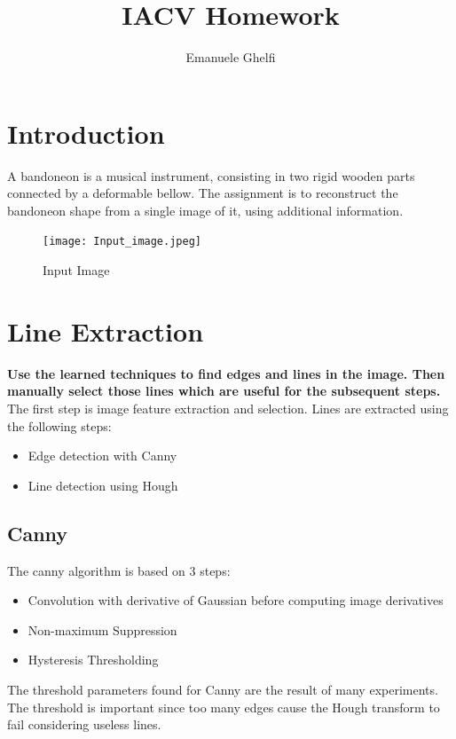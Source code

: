 \documentclass[11pt, oneside]{article}   	%
\title{IACV Homework}
\author{Emanuele Ghelfi}
\begin{document}
\maketitle

\pagebreak
\tableofcontents
\pagebreak
\section{Introduction}
A bandoneon is a musical instrument, consisting in two rigid wooden parts connected by a deformable bellow. The assignment is to reconstruct the bandoneon shape from a single image of it, using additional information.

\begin{figure}
\texttt{[image: Input\_image.jpeg]}

\caption{Input Image}
\label{default}
\end{figure}

\section{Line Extraction}
\textbf{Use the learned techniques to find edges and lines in the image. Then manually select those lines which are useful for the subsequent steps.} \hfill \break
The first step is image feature extraction and selection. 
Lines are extracted using the following steps:
\begin{itemize}
\item Edge detection with Canny
\item Line detection using Hough

\end{itemize}

\subsection{Canny} 
The canny algorithm is based on 3 steps:

\begin{itemize}
\item Convolution with derivative of Gaussian before computing image derivatives
\item Non-maximum Suppression
\item Hysteresis Thresholding
\end{itemize}

The threshold parameters found for Canny are the result of many experiments. The threshold is important since too many edges cause the Hough transform to fail considering useless lines.
\end{document}
